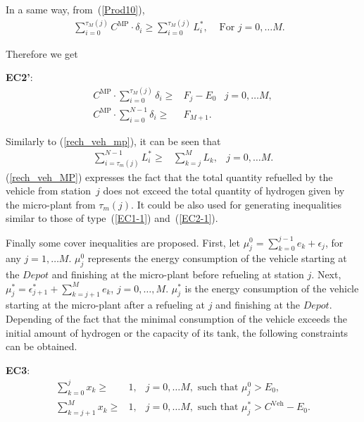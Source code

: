 \documentclass[11pt]{article}
\theoremstyle{plain}%
\theoremstyle{definition} \newtheorem{lem}{Lemma}[section]
\theoremstyle{definition} \newtheorem{claim}{Claim}[lem]
\theoremstyle{definition} \newtheorem{theorem}{Theorem}[section]
\theoremstyle{definition} \newtheorem{exo}{Exercice n$^\circ$}
\theoremstyle{definition} \newtheorem{quest}{}[exo]
\theoremstyle{definition} \newtheorem{sousquest}{}[quest]
\theoremstyle{remark}
\theoremstyle{definition}
\begin{document}
In a same way, from~(\ref{Prod10}), 
\begin{eqnarray}
\sum_{i=0}^{\tau_M(j)} C^{\textrm{MP}} \cdot \delta_i  \geq  \sum_{i=0}^{\tau_M(j)} L^*_i, & \textrm{ For }  j = 0, \ldots M.& \nonumber
\end{eqnarray}

Therefore we get

\textbf {EC2'}:
\begin{eqnarray}
C^{\textrm{MP}} \cdot \sum_{i=0}^{ \tau_M(j)} \delta_i \ge & F_j - E_0 & j=0,\ldots M,  \label{EC2-11} \\
C^{\textrm{MP}} \cdot \sum_{i=0}^{ N-1} \delta_i  \ge & F_{M+1}.  \label{EC2-22} 
\end{eqnarray}


Similarly to (\ref{rech_veh_mp}), it can be  seen that 
\begin{eqnarray}
 \sum_{i=\tau_m(j)}^{N-1}  L_i^*   \geq  & \sum_{k=j}^{M} L_k  ,&  j=0, \ldots M.  \label{rech_veh_MP} 
\end{eqnarray}
(\ref{rech_veh_MP})  expresses the fact that the total quantity refuelled by the vehicle from station~$j$ does not exceed the
total quantity of hydrogen given by the micro-plant from $\tau_m(j)$. It could be also used for
generating inequalities similar to those of  type~(\ref{EC1-1}) and~(\ref{EC2-1}).


Finally some cover inequalities are proposed.
First, let $ \mu^0_{j}= \sum_{k=0}^{j-1} e_k+ \epsilon_{j}$, for any $j=1, \dots M$.
$ \mu^0_{j} $ represents the   energy consumption of the vehicle starting at the $Depot$ and finishing at the micro-plant before refueling at station $j$.
Next,  $\mu^*_{j}= \epsilon ^*_{j+1} +\sum_{k=j+1}^{M} e_k$, $j=0, \dots, M$. 
$\mu^*_{j}$ is the energy consumption of the vehicle starting at the micro-plant after a refueling at $j$ and finishing at the $Depot$.
Depending of the fact that the minimal consumption of the vehicle exceeds the initial amount of
hydrogen or the capacity of its tank, the following constraints can be obtained.

\textbf {EC3}:
\begin{eqnarray}
\sum_{k=0}^{ j} x_k   \ge & 1, & j=0,\ldots M, \textrm{ such that } \mu^0_{j} > E_0, \label{EC3-1} \\
\sum_{k=j+1}^{ M} x_k \ge & 1, & j=0,\ldots M, \textrm{ such that } \mu^*_{j} > C^{\textrm{Veh}} - E_0.  \label{EC3-2} 
\end{eqnarray}
\end{document}

